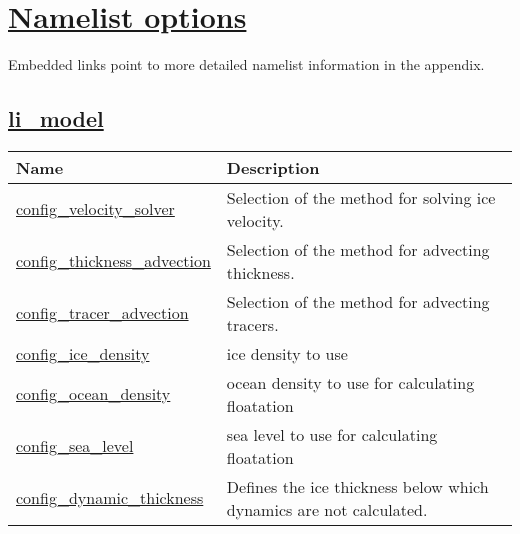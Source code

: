 \chapter[Namelist options]{\hyperref[chap:namelist_sections]{Namelist options}}
\label{chap:namelist_tables}
Embedded links point to more detailed namelist information in the appendix.
\section[li\_model]{\hyperref[sec:nm_sec_li_model]{li\_model}}
\label{sec:nm_tab_li_model}

{\small
\begin{center}
\begin{longtable}{| p{2.0in} || p{4.0in} |}
	\hline
	{\bf Name} & {\bf Description} \\
	\hline
	\hline
	\hyperref[subsec:nm_sec_config_velocity_solver]{config\_velocity\_solver} & Selection of the method for solving ice velocity. \\
	\hline
	\hyperref[subsec:nm_sec_config_thickness_advection]{config\_thickness\_advection} & Selection of the method for advecting thickness. \\
	\hline
	\hyperref[subsec:nm_sec_config_tracer_advection]{config\_tracer\_advection} & Selection of the method for advecting tracers. \\
	\hline
	\hyperref[subsec:nm_sec_config_ice_density]{config\_ice\_density} & ice density to use \\
	\hline
	\hyperref[subsec:nm_sec_config_ocean_density]{config\_ocean\_density} & ocean density to use for calculating floatation \\
	\hline
	\hyperref[subsec:nm_sec_config_sea_level]{config\_sea\_level} & sea level to use for calculating floatation \\
	\hline
	\hyperref[subsec:nm_sec_config_dynamic_thickness]{config\_dynamic\_thickness} & Defines the ice thickness below which dynamics are not calculated. \\
	\hline
\end{longtable}
\end{center}
}
